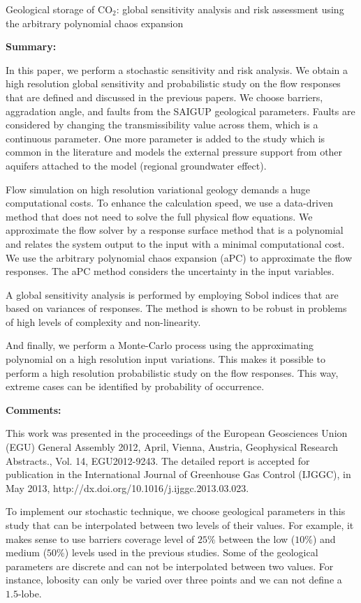 {Geological storage of $\mbox{CO}_2$: global sensitivity analysis and risk
assessment using the arbitrary polynomial chaos expansion}
{\textbf{Summary:}

In this paper, we perform a stochastic sensitivity and risk analysis. We obtain
a high resolution global sensitivity and probabilistic study on the flow
responses that are defined and discussed in the previous papers. We choose
barriers, aggradation angle, and
faults from the SAIGUP geological parameters. Faults are considered by changing
the transmissibility value across them, which
is a continuous parameter. One more parameter is added to the study which is
common in the literature and models the external pressure support from other
aquifers attached to the model (regional groundwater effect).

Flow simulation on high resolution variational geology demands a huge
computational costs. To enhance the calculation speed, we use a data-driven
method that does not need to solve the full physical flow equations. We
approximate the flow solver by a response surface method that is a polynomial
and relates the system output to the input with a minimal computational cost.
We use the arbitrary polynomial chaos expansion (aPC) to approximate the
flow responses. The aPC method considers the uncertainty in the input variables.

A global sensitivity analysis is performed by employing Sobol indices that are
based on variances of responses. The method is shown to be robust in problems
of high levels of complexity and non-linearity.  

And finally, we perform a Monte-Carlo process using the approximating polynomial
on a high resolution input variations. This makes it possible to perform a high
resolution probabilistic study on the flow responses. This way, extreme cases
can be identified by probability of occurrence.

\vspace{0.5cm}
\noindent\textbf{Comments:}

This work was presented in the proceedings of the European Geosciences Union (EGU) General Assembly 2012, April, Vienna, Austria, Geophysical Research Abstracts., Vol. 14, EGU2012-9243. The detailed report is accepted for publication in the International Journal of
Greenhouse Gas Control (IJGGC), in May 2013, http://dx.doi.org/10.1016/j.ijggc.2013.03.023.
 
To implement our stochastic technique, we choose geological parameters
in this study that can be interpolated between two levels of their values. For
example, it makes sense to use barriers coverage level of $25\%$ between the low
($10\%$) and medium ($50\%$) levels used in the previous studies. Some of the
geological parameters are discrete and can not be interpolated between two
values. For instance, lobosity can only be varied over three points and we can
not define a $1.5$-lobe. 

}
